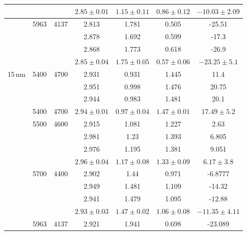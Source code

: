 \documentclass{article}
\begin{document}
\begin{table}
\begin{tabular}{|c|c|c|c|c|c|c|}
     \hline
              &      &             & $2.85 \pm 0.01$ & $1.15 \pm 0.11$ & $0.86 \pm 0.12$ & $-10.03\pm 2.09$ \\
     \hline
              &5963 & 4137         & 2.813        & 1.781        & 0.505       & -25.51  \\
              &     &              & 2.878        & 1.692        & 0.599       & -17.3   \\
              &     &              & 2.868        & 1.773        & 0.618       & -26.9   \\
     \hline
              &     &              & $2.85 \pm 0.04$ & $1.75 \pm 0.05$ & $0.57 \pm 0.06$ & $-23.25\pm 5.1$ \\
      \hline

      15\,nm  &5400 & 4700         & 2.931        & 0.931        & 1.445      & 11.4    \\
              &     &              & 2.951        & 0.998        & 1.476      & 20.75   \\
              &     &              & 2.944        & 0.983        & 1.481      & 20.1    \\
      \hline
              &5400 & 4700 & $2.94 \pm 0.01$ & $0.97 \pm 0.04$ & $1.47 \pm 0.01$ & $17.49 \pm 5.2$ \\
       \hline      
              &5500 & 4600         & 2.915        & 1.081        & 1.227      & 2.63    \\
              &     &              & 2.981        & 1.23         & 1.393      & 6.805   \\
              &     &              & 2.976        & 1.195        & 1.381      & 9.051   \\
       \hline
              &     &  & $2.96 \pm 0.04$ & $1.17 \pm 0.08$ & $1.33 \pm 0.09$ & $6.17  \pm 3.8$ \\
        \hline
              &5700 & 4400         & 2.902        & 1.44         & 0.971      & -6.8777 \\
              &     &              & 2.949        & 1.481        & 1.109      & -14.32  \\
              &     &              & 2.941        & 1.479        & 1.095      & -12.88  \\
        \hline
              &     &  & $2.93 \pm 0.03$ & $1.47 \pm 0.02$ & $1.06 \pm 0.08$ & $-11.35\pm4.11$ \\
        \hline
              &5963 & 4137         & 2.921        & 1.941        & 0.698      & -23.089  \\

\end{tabular}
\end{table}
\end{document}
